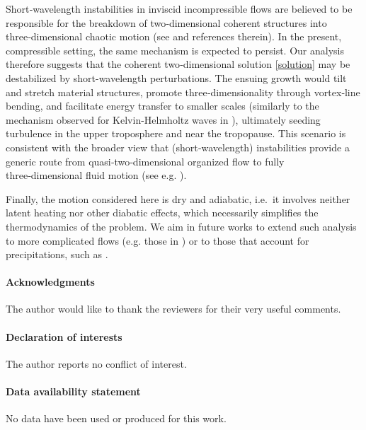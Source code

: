 \documentclass[reqno]{amsart}
\begin{document}
\noindent
Short‑wavelength instabilities in inviscid incompressible flows are believed to be responsible for the breakdown of two‑dimensional coherent structures into three‑dimensional chaotic motion (see \cite{lifschitz} and references therein). In the present, compressible setting, the same mechanism is expected to persist. Our analysis therefore suggests that the coherent two‑dimensional solution \eqref{solution} may be destabilized by short-wavelength perturbations. The ensuing growth would tilt and stretch material structures, promote three‑dimensionality through vortex‑line bending, and facilitate energy transfer to smaller scales (similarly to the mechanism observed for Kelvin-Helmholtz waves in \cite{Klaassen}), ultimately seeding turbulence in the upper troposphere and near the tropopause. This scenario is consistent with the broader view that (short‑wavelength) instabilities provide a generic route from quasi‑two‑dimensional organized flow to fully three‑dimensional fluid motion (see e.g. \cite{PW82,Or, corcos1, corcos2,Rob, P86, M_etal}).

Finally, the motion considered here is dry and adiabatic, i.e.\ it involves neither latent heating nor other diabatic effects, which necessarily simplifies the thermodynamics of the problem. We aim in future works to extend such analysis to more complicated flows (e.g. those in  \cite{henry}) or to those that account for precipitations, such as \cite{Lyons2025,McCL}.\\
%
%



\vspace{.51cm}
\paragraph*{\bf Acknowledgments} The author would like to thank the reviewers for their very useful comments.
\paragraph*{\bf Declaration of interests}
The author reports no conflict of interest.


\paragraph*{\bf Data availability statement}
No data have been used or produced for this work.
\end{document}

